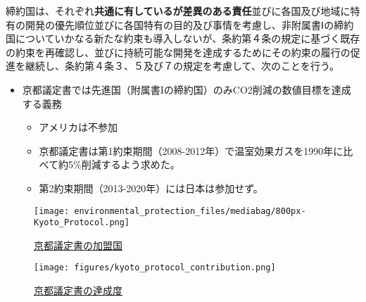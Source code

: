 \documentclass[
  xelatex,
  ja=standard]{bxjsarticle}
\providecommand{\tightlist}{%
  \setlength{\itemsep}{0pt}\setlength{\parskip}{0pt}}\usepackage{longtable,booktabs,array}
\begin{document}
\begin{tcolorbox}[enhanced jigsaw, left=2mm, arc=.35mm, breakable, coltitle=black, bottomtitle=1mm, toprule=.15mm, leftrule=.75mm, colbacktitle=quarto-callout-note-color!10!white, colback=white, colframe=quarto-callout-note-color-frame, bottomrule=.15mm, titlerule=0mm, toptitle=1mm, opacitybacktitle=0.6, opacityback=0, rightrule=.15mm, title=\textcolor{quarto-callout-note-color}{\faInfo}\hspace{0.5em}{\href{https://www.mofa.go.jp/mofaj/gaiko/treaty/treaty_020413.html}{気候変動に関する国際連合枠組条約の京都議定書}　第10条}]

締約国は、それぞれ\textbf{共通に有しているが差異のある責任}並びに各国及び地域に特有の開発の優先順位並びに各国特有の目的及び事情を考慮し、非附属書Ⅰの締約国についていかなる新たな約束も導入しないが、条約第４条の規定に基づく既存の約束を再確認し、並びに持続可能な開発を達成するためにその約束の履行の促進を継続し、条約第４条３、５及び７の規定を考慮して、次のことを行う。

\end{tcolorbox}

\begin{itemize}
\tightlist
\item
  京都議定書では先進国（附属書Iの締約国）のみCO2削減の数値目標を達成する義務

  \begin{itemize}
  \tightlist
  \item
    アメリカは不参加
  \item
    京都議定書は第1約束期間（2008-2012年）で温室効果ガスを1990年に比べて約5\%削減するよう求めた。
  \item
    第2約束期間（2013-2020年）には日本は参加せず。
  \end{itemize}
\end{itemize}

\begin{figure}[htpb]

{\centering \texttt{[image: environmental\_protection\_files/mediabag/800px-Kyoto\_Protocol.png]}

}

\caption{\href{https://commons.wikimedia.org/wiki/File:Kyoto_Protocol_parties.svg}{京都議定書の加盟国}}

\end{figure}

\begin{figure}[htpb]

{\centering \texttt{[image: figures/kyoto\_protocol\_contribution.png]}

}

\caption{\href{https://www.theguardian.com/environment/blog/2012/nov/26/kyoto-protocol-carbon-emissions}{京都議定書の達成度}}

\end{figure}
\end{document}
